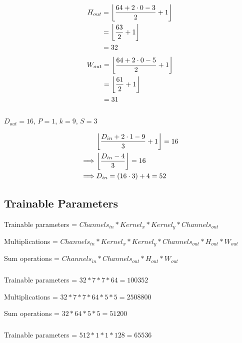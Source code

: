 \documentclass[9pt]{paper}
\DeclarePairedDelimiter\floor{\lfloor}{\rfloor}
\begin{document}
\begin{multicols}{2}
\begin{equation*}
\begin{split}
	H_{out} &= \floor*{\frac{64 + 2\cdot0 - 3}{2} + 1}\\
		&= \floor*{\frac{63}{2} + 1}\\
		&=32
\end{split}
\end{equation*}\break
\begin{equation*}
\begin{split}
	W_{out} &= \floor*{\frac{64 + 2\cdot0 - 5}{2} + 1}\\
		&= \floor*{\frac{61}{2} + 1}\\
		&=31
\end{split}
\end{equation*}
\end{multicols}

\subsubsection{}
\begin{multicols}{5}
$D_{out}=16$,\break
$P=1$,\break
$k=9$,\break
$S=3$
\end{multicols}

\begin{equation*}
\begin{split}
	&\floor*{\frac{D_{in} + 2\cdot1 - 9}{3} + 1} = 16\\
	\implies&\floor*{\frac{D_{in} - 4}{3}} = 16\\
	\implies&D_{in} = (16\cdot3)+4 = 52
\end{split}
\end{equation*}


\subsection{Trainable Parameters}
Trainable parameters = $Channels_{in} * Kernel_x * Kernel_y * Channels_{out}$

\noindent Multiplications = $Channels_{in} * Kernel_x * Kernel_y * Channels_{out} * H_{out} * W_{out}$

\noindent Sum operations = $Channels_{in} * Channels_{out} * H_{out} * W_{out}$

\subsubsection{}
Trainable parameters = $32 * 7 * 7 * 64 = 100352$

\noindent Multiplications = $32 * 7 * 7 * 64 * 5 * 5 = 2508800$

\noindent Sum operations = $32 * 64 * 5 * 5 = 51200$

\subsubsection{}
Trainable parameters = $512 * 1 * 1 * 128 = 65536$
\end{document}
